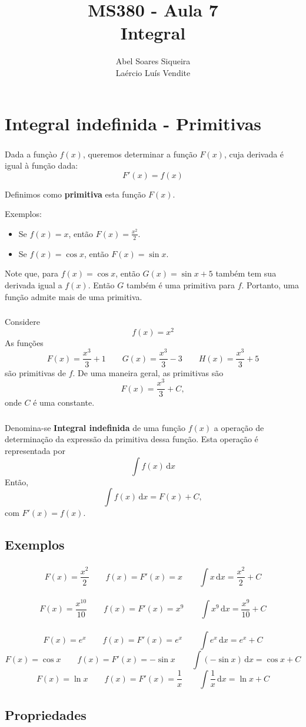 \documentclass[10 pt]{beamer}
\title{ MS380 - Aula 7 \\
Integral}
\author{Abel Soares Siqueira \\
Laércio Luís Vendite}
\date{}
\newcommand{\makesection}[1]{\section[#1]{#1}}
\newcommand{\makesubsection}[1]{\subsection[#1]{#1}}
\newcommand{\dif}{\,\mathrm{d}}
\newcommand{\myframe}[1]{
\begin{frame}
 \frametitle{\insertsection \qquad {\small \insertsubsection}}
#1
\end{frame}}
\begin{document}
\begin{frame}
 \titlepage
\end{frame}

\makesection{Integral indefinida - Primitivas}

\myframe{
  Dada a funçào $f(x)$, queremos determinar a função $F(x)$, cuja derivada
  é igual à função dada:
  $$ F'(x) = f(x) $$

  Definimos como {\bf primitiva} esta função $F(x)$.

  Exemplos:
  \begin{itemize}
    \item Se $f(x) = x$, então $F(x) = \frac{x^2}{2}$.
    \item Se $f(x) = \cos x$, então $F(x) = \sin x$.
  \end{itemize}

  Note que, para $f(x) = \cos x$, então $G(x) = \sin x + 5$ também tem
  sua derivada igual a $f(x)$. Então $G$ também é uma primitiva para $f$.
  Portanto, uma função admite mais de uma primitiva.
}

\myframe{
  Considere
  $$ f(x) = x^2 $$
  As funções
  $$ F(x) = \frac{x^3}{3} + 1 \qquad
     G(x) = \frac{x^3}{3} - 3 \qquad
     H(x) = \frac{x^3}{3} + 5 $$
     são primitivas de $f$.
  De uma maneira geral, as primitivas são
  $$ F(x) = \frac{x^3}{3} + C, $$
  onde $C$ é uma constante.
}

\myframe{
  Denomina-se {\bf Integral indefinida} de uma função $f(x)$ a operação
  de determinação da expressão da primitiva dessa função.
  Esta operação é representada por
  $$ \int\! f(x)\dif x $$
  Então, 
  $$ \int\! f(x)\dif x = F(x) + C, $$
  com $F'(x) = f(x)$.
}

\makesubsection{Exemplos}

\myframe{

    $$F(x) = \frac{x^2}{2} \qquad 
      f(x) = F'(x) = x \qquad 
      \int\! x\dif x = \frac{x^2}{2} + C$$ \\
    $$F(x) = \frac{x^{10}}{10} \qquad 
      f(x) = F'(x) = x^9 \qquad 
      \int\! x^9\dif x = \frac{x^9}{10} + C$$ \\
    $$F(x) = e^x \qquad 
      f(x) = F'(x) = e^x \qquad 
      \int\! e^x \dif x = e^x + C$$
    $$F(x) = \cos x \qquad
      f(x) = F'(x) = -\sin x \qquad
      \int\! (-\sin x) \dif x = \cos x + C$$
    $$F(x) = \ln x \qquad
      f(x) = F'(x) = \frac{1}{x} \qquad
      \int\! \frac{1}{x}\dif x = \ln x + C$$
}

\makesubsection{Propriedades}
\end{document}
